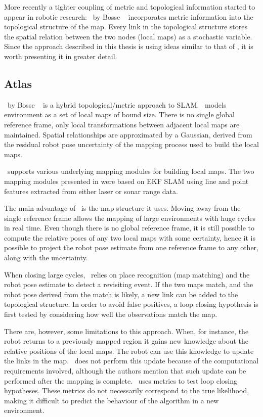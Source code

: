 More recently a tighter coupling of metric and topological information
started to appear in robotic research: \Atlas\ by Bosse
\etal\ \cite{bosse03atlas} incorporates metric information into the
topological structure of the map. Every link in the topological
structure stores the spatial relation between the two nodes (local
maps) as a stochastic variable. Since the approach described in this
thesis is using ideas similar to that of \Atlas, it is worth
presenting it in greater detail.



\subsection{Atlas}

\Atlas\ by Bosse \etal\ \cite{bosse03atlas} is a hybrid
topological/metric approach to SLAM. \Atlas\ models environment as a
set of local maps of bound size. There is no single global reference
frame, only local transformations between adjacent local maps are
maintained. Spatial relationships are approximated by a Gaussian,
derived from the residual robot pose uncertainty of the mapping
process used to build the local maps.

\Atlas\ supports various underlying mapping modules for building local
maps. The two mapping modules presented in \cite{bosse03atlas} were
based on EKF SLAM using line and point features extracted from either
laser or sonar range data.

The main advantage of \Atlas\ is the map structure it uses. Moving
away from the single reference frame allows the mapping of large
environments with huge cycles in real time. Even though there is no
global reference frame, it is still possible to compute the relative
poses of any two local maps with some certainty, hence it is possible
to project the robot pose estimate from one reference frame to any
other, along with the uncertainty.


When closing large cycles, \Atlas\ relies on place recognition
(map matching) and the robot pose estimate to detect a revisiting
event. If the two maps match, and the robot pose derived from the
match is likely, a new link can be added to the topological structure.
In order to avoid false positives, a loop closing hypothesis is first
tested by considering how well the observations match the map.

There are, however, some limitations to this approach. When, for
instance, the robot returns to a previously mapped region it gains new
knowledge about the relative positions of the local maps. The robot
can use this knowledge to update the links in the map. \Atlas\ does
not perform this update because of the computational requirements
involved, although the authors mention that such update can be performed
after the mapping is complete. \Atlas\ uses metrics to test loop
closing hypotheses. These metrics do not necessarily correspond to the
true likelihood, making it difficult to predict the behaviour of the
algorithm in a new environment.

